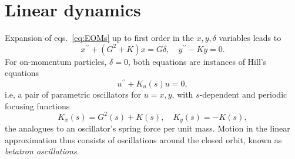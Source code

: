 \section{Linear dynamics}
Expansion of eqs.~\eqref{eq:EOMs} up to first order in the $x, y, \delta$ variables leads to \cite{sands_physics_1969}
    \begin{equation}
        x^{\prime\prime}+(G^2+K)x=G\delta, \quad
        y^{\prime\prime}-Ky=0.
        \label{eq:linearEOM}
    \end{equation}
    For on-momentum particles, $\delta=0$, both equations are instances of Hill's equations
    \begin{equation}
        u^{\prime\prime}+K_u(s)u = 0,
        \label{eq:Hill}
    \end{equation}
   i.e, a pair of parametric oscillators for $u=x,y$, with $s$-dependent and periodic focusing functions
         $$K_x(s) = G^2(s) + K(s), \quad K_y(s) = - K(s),$$
    the analogues to an oscillator's spring force per unit mass. Motion in the linear approximation thus consists of oscillations around the closed orbit, known as \textit{betatron oscillations}.
